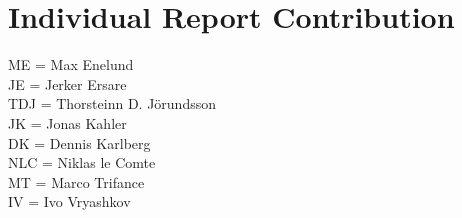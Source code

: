 \label{appendix}
\appendix

\chapter{Individual Report Contribution}
ME = Max Enelund\\
JE = Jerker Ersare\\
TDJ = Thorsteinn D. J{\"o}rundsson\\
JK = Jonas Kahler\\
DK = Dennis Karlberg\\
NLC = Niklas le Comte\\
MT = Marco Trifance\\
IV = Ivo Vryashkov